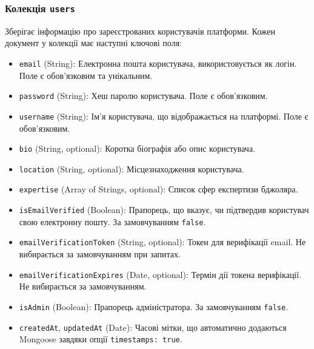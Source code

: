 \subsubsection*{Колекція \texttt{users}}
Зберігає інформацію про зареєстрованих користувачів платформи. Кожен документ у колекції має наступні ключові поля:
\begin{itemize}
    \item \texttt{email} (String): Електронна пошта користувача, використовується як логін. Поле є обов'язковим та унікальним.
    \item \texttt{password} (String): Хеш паролю користувача. Поле є обов'язковим.
    \item \texttt{username} (String): Ім'я користувача, що відображається на платформі. Поле є обов'язковим.
    \item \texttt{bio} (String, optional): Коротка біографія або опис користувача.
    \item \texttt{location} (String, optional): Місцезнаходження користувача.
    \item \texttt{expertise} (Array of Strings, optional): Список сфер експертизи бджоляра.
    \item \texttt{isEmailVerified} (Boolean): Прапорець, що вказує, чи підтвердив користувач свою електронну пошту. За замовчуванням \texttt{false}.
    \item \texttt{emailVerificationToken} (String, optional): Токен для верифікації email. Не вибирається за замовчуванням при запитах.
    \item \texttt{emailVerificationExpires} (Date, optional): Термін дії токена верифікації. Не вибирається за замовчуванням.
    \item \texttt{isAdmin} (Boolean): Прапорець адміністратора. За замовчуванням \texttt{false}.
    \item \texttt{createdAt}, \texttt{updatedAt} (Date): Часові мітки, що автоматично додаються Mongoose завдяки опції \texttt{{timestamps: true}}.
\end{itemize}

